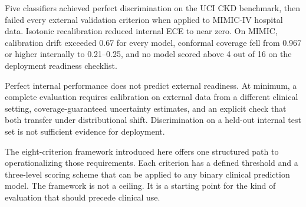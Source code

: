 Five classifiers achieved perfect discrimination on the UCI CKD benchmark, then failed every external validation criterion when applied to MIMIC-IV hospital data. Isotonic recalibration reduced internal ECE to near zero. On MIMIC, calibration drift exceeded 0.67 for every model, conformal coverage fell from 0.967 or higher internally to 0.21--0.25, and no model scored above 4 out of 16 on the deployment readiness checklist.

Perfect internal performance does not predict external readiness. At minimum, a complete evaluation requires calibration on external data from a different clinical setting, coverage-guaranteed uncertainty estimates, and an explicit check that both transfer under distributional shift. Discrimination on a held-out internal test set is not sufficient evidence for deployment.

The eight-criterion framework introduced here offers one structured path to operationalizing those requirements. Each criterion has a defined threshold and a three-level scoring scheme that can be applied to any binary clinical prediction model. The framework is not a ceiling. It is a starting point for the kind of evaluation that should precede clinical use.

